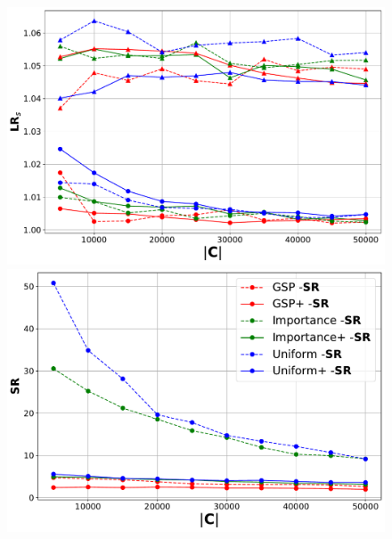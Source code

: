 \begin{figure}[!htbp]
    
    \begin{minipage}{0.49\linewidth}
        \centering
        \includegraphics[width=\linewidth]{./fig/loss_ratio(0.001,0.02) - Covertype.pdf}
    \end{minipage}
    \hfill
    \begin{minipage}{0.45\linewidth}
        \centering
        \includegraphics[width=\linewidth]{./fig/time_ratio(0.001,0.02) - Covertype.pdf}
    \end{minipage}
    \\
    \begin{minipage}{0.45\linewidth}

\end{minipage}
\end{figure}
